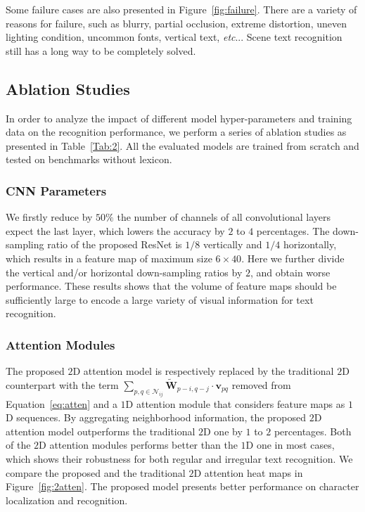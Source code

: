 \documentclass[letterpaper]{article} \usepackage{aaai19}  \usepackage{times}  \usepackage{helvet}  \usepackage{courier}  \usepackage{url}  \usepackage{graphicx}  \usepackage{amsmath}
\makeatletter
\DeclareRobustCommand\onedot{\futurelet\@let@token\@onedot}
\def\@onedot{\ifx\@let@token.\else.\null\fi\xspace}
\def\etc{\emph{etc}\onedot} \def\vs{\emph{vs}\onedot}
\makeatother
\begin{document}
Some failure cases are also presented in Figure~\ref{fig:failure}.
There are a variety of reasons for failure, such as blurry, partial occlusion, extreme distortion, uneven lighting condition, uncommon fonts, vertical text, \etc.
Scene text recognition still has a long way to be completely solved.

\subsection{Ablation Studies}

In order to analyze the impact of different model hyper-parameters and training data on the recognition performance, we perform a series of ablation studies as presented in Table~\ref{Tab:2}.
All the evaluated models are trained from scratch and tested on benchmarks without lexicon.

\subsubsection{\bf CNN Parameters}
We firstly reduce by $50\%$ the number of channels of all convolutional layers expect the last layer, which lowers the accuracy by $2$ to $4$ percentages.
The down-sampling ratio of the proposed ResNet is $1/8$ vertically and $1/4$ horizontally, which results in a feature map of maximum size $6 \times 40$.
Here we further divide the vertical and/or horizontal down-sampling ratios by $2$, and obtain worse performance.
These results shows that the volume of feature maps should be sufficiently large to encode a large variety of visual information for text recognition.


\subsubsection{\bf Attention Modules}
The proposed $2$D attention model is respectively replaced by the traditional $2$D counterpart with the term ${\sum_{p,q \in \mathcal{N}_{ij}}}\! {\mathbf{\tilde{W}}_{p-i,q-j} \cdot \mathbf{v}_{pq}}$ removed from Equation~\eqref{eq:atten} and a $1$D attention module that considers feature maps as $1$D sequences.
By aggregating neighborhood information, the proposed $2$D attention model outperforms the traditional $2$D one by $1$ to $2$ percentages.
Both of the $2$D attention modules performs better than the $1$D one in most cases, which shows their robustness for both regular and irregular text recognition.
We compare the proposed and the traditional $2$D attention heat maps in Figure~\ref{fig:2atten}.
The proposed model presents better performance on character localization and recognition.
\end{document}
